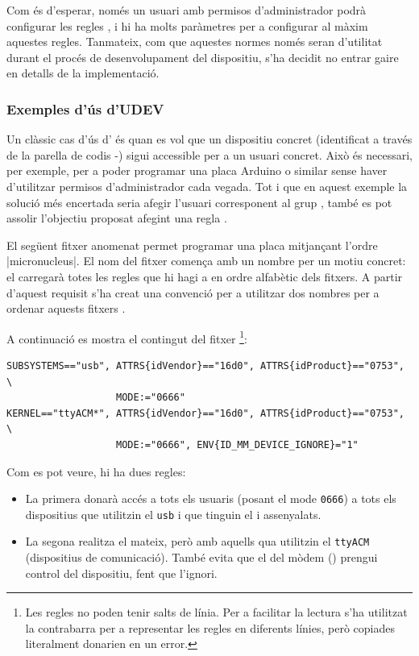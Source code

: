 Com és d'esperar, només un usuari amb permisos d'administrador podrà configurar
les regles , i hi ha molts paràmetres per a configurar al màxim
aquestes regles. Tanmateix, com que aquestes normes només seran d'utilitat durant
el procés de desenvolupament del dispositiu, s'ha decidit no entrar gaire en
detalls de la implementació.

\subsubsection*{Exemples d'ús d'UDEV}

Un clàssic cas d'ús d' és quan es vol que un dispositiu 
concret (identificat a través de la parella de codis -)
sigui accessible per a un usuari concret. Això és necessari, per exemple, per a
poder programar una placa Arduino o similar sense haver d'utilitzar permisos
d'administrador cada vegada.
Tot i que en aquest exemple la solució més encertada seria afegir l'usuari
corresponent al grup , també es pot assolir l'objectiu proposat
afegint una regla .

El següent fitxer anomenat  permet programar una
placa  mitjançant l'ordre \ord|micronucleus|. El nom del fitxer
comença amb un nombre per un motiu concret: el  carregarà totes les
regles que hi hagi a  en ordre alfabètic dels fitxers.
A partir d'aquest requisit s'ha creat una convenció per a utilitzar dos nombres
per a ordenar aquests fitxers \cite{Udev}.

A continuació es mostra el contingut del fitxer
\footnote{
    Les regles  no poden tenir salts de línia. Per a facilitar la
    lectura s'ha utilitzat la contrabarra per a representar les regles en
    diferents línies, però copiades literalment donarien en un error.
}:

\begin{verbatim}
SUBSYSTEMS=="usb", ATTRS{idVendor}=="16d0", ATTRS{idProduct}=="0753", \
                   MODE:="0666"
KERNEL=="ttyACM*", ATTRS{idVendor}=="16d0", ATTRS{idProduct}=="0753", \
                   MODE:="0666", ENV{ID_MM_DEVICE_IGNORE}="1"
\end{verbatim}

Com es pot veure, hi ha dues regles:
\begin{itemize}
    \item La primera donarà accés a tots els usuaris (posant el mode
    \texttt{0666}) a tots els dispositius que utilitzin el 
    \texttt{usb} i que tinguin el \acro{vid} i \acro{pid} assenyalats.
    \item La segona realitza el mateix, però amb aquells qua utilitzin el
    \est{driver} \texttt{ttyACM} (dispositius de comunicació). També evita que
    el \est{driver} del mòdem (\est{ModemManager}) prengui control del
    dispositiu, fent que l'ignori.
\end{itemize}

